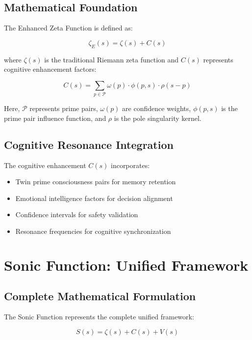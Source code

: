\documentclass[12pt,a4paper]{article}
\begin{document}
\subsection{Mathematical Foundation}

The Enhanced Zeta Function is defined as:

\begin{equation}
\zeta_E(s) = \zeta(s) + C(s)
\label{eq:enhanced_zeta}
\end{equation}

where $\zeta(s)$ is the traditional Riemann zeta function and $C(s)$ represents cognitive enhancement factors:

\begin{equation}
C(s) = \sum_{p \in \mathcal{P}} \omega(p) \cdot \phi(p, s) \cdot \rho(s - p)
\label{eq:confidence_pairs}
\end{equation}

Here, $\mathcal{P}$ represents prime pairs, $\omega(p)$ are confidence weights, $\phi(p, s)$ is the prime pair influence function, and $\rho$ is the pole singularity kernel.

\subsection{Cognitive Resonance Integration}

The cognitive enhancement $C(s)$ incorporates:
\begin{itemize}
\item Twin prime consciousness pairs for memory retention
\item Emotional intelligence factors for decision alignment
\item Confidence intervals for safety validation
\item Resonance frequencies for cognitive synchronization
\end{itemize}

\section{Sonic Function: Unified Framework}

\subsection{Complete Mathematical Formulation}

The Sonic Function represents the complete unified framework:

\begin{equation}
S(s) = \zeta(s) + C(s) + V(s)
\label{eq:sonic_function}
\end{equation}
\end{document}
